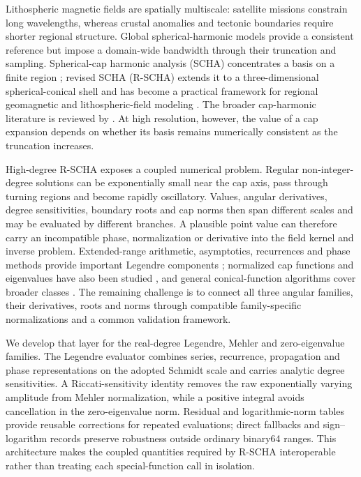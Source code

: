 ﻿\documentclass[11pt,a4paper]{article}
\newcommand{\RSCHA}{\textsc{R-SCHA}\xspace}
\begin{document}
Lithospheric magnetic fields are spatially multiscale: satellite missions constrain long wavelengths, whereas crustal anomalies and tectonic boundaries require shorter regional structure. Global spherical-harmonic models provide a consistent reference but impose a domain-wide bandwidth through their truncation and sampling. Spherical-cap harmonic analysis (SCHA) concentrates a basis on a finite region \citep{Haines1985}; revised SCHA (\RSCHA) extends it to a three-dimensional spherical-conical shell and has become a practical framework for regional geomagnetic and lithospheric-field modeling \citep{ThebaultEtAl2004,ThebaultEtAl2006,VervelidouEtAl2018,ZhangEtAl2025EPP}. The broader cap-harmonic literature is reviewed by \citet{Torta2020}. At high resolution, however, the value of a cap expansion depends on whether its basis remains numerically consistent as the truncation increases.

High-degree \RSCHA exposes a coupled numerical problem. Regular non-integer-degree solutions can be exponentially small near the cap axis, pass through turning regions and become rapidly oscillatory. Values, angular derivatives, degree sensitivities, boundary roots and cap norms then span different scales and may be evaluated by different branches. A plausible point value can therefore carry an incompatible phase, normalization or derivative into the field kernel and inverse problem. Extended-range arithmetic, asymptotics, recurrences and phase methods provide important Legendre components \citep{OlverSmith1983,SmithEtAl1981,Fukushima2012,BremerRokhlin2017,Bremer2018}; normalized cap functions and eigenvalues have also been studied \citep{HwangChen1997}, and general conical-function algorithms cover broader classes \citep{GilEtAl2009,GilEtAl2012,DunsterEtAl2015}. The remaining challenge is to connect all three angular families, their derivatives, roots and norms through compatible family-specific normalizations and a common validation framework.

We develop that layer for the real-degree Legendre, Mehler and zero-eigenvalue families. The Legendre evaluator combines series, recurrence, propagation and phase representations on the adopted Schmidt scale and carries analytic degree sensitivities. A Riccati-sensitivity identity removes the raw exponentially varying amplitude from Mehler normalization, while a positive integral avoids cancellation in the zero-eigenvalue norm. Residual and logarithmic-norm tables provide reusable corrections for repeated evaluations; direct fallbacks and sign--logarithm records preserve robustness outside ordinary binary64 ranges. This architecture makes the coupled quantities required by \RSCHA interoperable rather than treating each special-function call in isolation.
\end{document}
